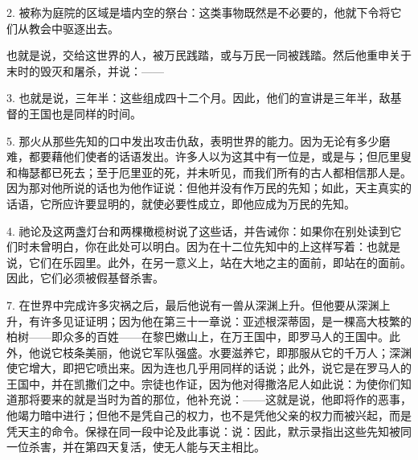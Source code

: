 2. 被称为庭院的区域是墙内空的祭台：这类事物既然是不必要的，他就下令将它们从教会中驱逐出去。\par

也就是说，交给这世界的人，被万民践踏，或与万民一同被践踏。然后他重申关于末时的毁灭和屠杀，并说：——\par

3. 也就是说，三年半：这些组成四十二个月。因此，他们的宣讲是三年半，敌基督的王国也是同样的时间。\par

5. 那火从那些先知的口中发出攻击仇敌，表明世界的能力。因为无论有多少磨难，都要藉他们使者的话语发出。许多人以为这其中有一位是，或是与；但厄里叟和梅瑟都已死去；至于厄里亚的死，并未听见，而我们所有的古人都相信那人是。因为那对他所说的话也为他作证说：但他并没有作万民的先知；如此，天主真实的话语，它所应许要显明的，就使必要性成立，即他应成为万民的先知。\par

4. 祂论及这两盏灯台和两棵橄榄树说了这些话，并告诫你：如果你在别处读到它们时未曾明白，你在此处可以明白。因为在十二位先知中的上这样写着：也就是说，它们在乐园里。此外，在另一意义上，站在大地之主的面前，即站在的面前。因此，它们必须被假基督杀害。\par

7. 在世界中完成许多灾祸之后，最后他说有一兽从深渊上升。但他要从深渊上升，有许多见证证明；因为他在第三十一章说：亚述根深蒂固，是一棵高大枝繁的柏树——即众多的百姓——在黎巴嫩山上，在万王国中，即罗马人的王国中。此外，他说它枝条美丽，他说它军队强盛。水要滋养它，即那服从它的千万人；深渊使它增大，即把它喷出来。因为连也几乎用同样的话说；此外，说它是在罗马人的王国中，并在凯撒们之中。宗徒也作证，因为他对得撒洛尼人如此说：为使你们知道那将要来的就是当时为首的那位，他补充说：——这就是说，他即将作的恶事，他竭力暗中进行；但他不是凭自己的权力，也不是凭他父亲的权力而被兴起，而是凭天主的命令。保禄在同一段中论及此事说：说：因此，默示录指出这些先知被同一位杀害，并在第四天复活，使无人能与天主相比。\par

